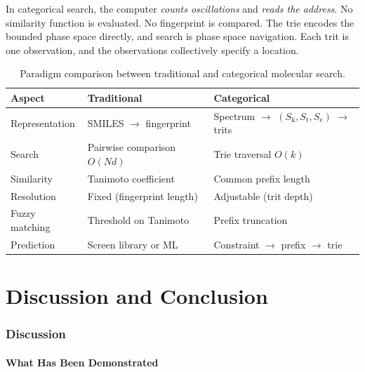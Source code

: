 \documentclass[11pt,twocolumn,a4paper]{article}
\theoremstyle{definition}
\theoremstyle{remark}
\newcommand{\Sk}{S_{\mathrm{k}}}
\newcommand{\St}{S_{\mathrm{t}}}
\newcommand{\Se}{S_{\mathrm{e}}}
\begin{document}
In categorical search, the computer \emph{counts oscillations} and \emph{reads the address}. No similarity function is evaluated. No fingerprint is compared. The trie encodes the bounded phase space directly, and search is phase space navigation. Each trit is one observation, and the observations collectively specify a location.

\begin{table}[H]
\centering
\caption{Paradigm comparison between traditional and categorical molecular search.}
\label{tab:paradigm}
\begin{tabular}{lll}
\toprule
Aspect & Traditional & Categorical \\
\midrule
Representation & SMILES $\to$ fingerprint & Spectrum $\to$ $(\Sk, \St, \Se)$ $\to$ trits \\
Search & Pairwise comparison $O(Nd)$ & Trie traversal $O(k)$ \\
Similarity & Tanimoto coefficient & Common prefix length \\
Resolution & Fixed (fingerprint length) & Adjustable (trit depth) \\
Fuzzy matching & Threshold on Tanimoto & Prefix truncation \\
Prediction & Screen library or ML & Constraint $\to$ prefix $\to$ trie \\
\bottomrule
\end{tabular}
\end{table}


\part{Discussion and Conclusion}

\section{Discussion}
\label{sec:discussion}

\subsection{What Has Been Demonstrated}
\end{document}
